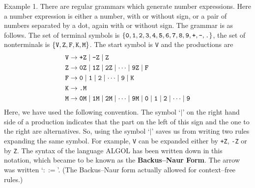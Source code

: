 {\sc Example 1.}
There are regular grammars which generate number expressions.
Here a number expression is either a number, with or without
sign, or a pair of numbers separated by a dot, again
with or without sign. The grammar is as follows. The set of
terminal symbols is $\{\mbox{\tt 0}, \mbox{\tt 1}, \mbox{\tt 2},
\mbox{\tt 3}, \mbox{\tt 4}, \mbox{\tt 5}, \mbox{\tt 6}, \mbox{\tt 7},
\mbox{\tt 8}, \mbox{\tt 9}, \mbox{\tt +}, \mbox{\tt -}, \mbox{\tt .}\}$,
the set of nonterminals is $\{\mbox{\tt V},
\mbox{\tt Z}, \mbox{\tt F}, \mbox{\tt K}, \mbox{\tt M}\}$.
The start symbol is {\tt V} and the productions are
\begin{equation}
\begin{split}
\mbox{\tt V} & \rightarrow \mbox{\tt +Z} \mid \mbox{\tt -Z} \mid 
	\mbox{\tt Z} \\
\mbox{\tt Z} & \rightarrow \mbox{\tt 0Z} \mid \mbox{\tt 1Z} \mid 
	\mbox{\tt 2Z} \mid \dotsb \mid \mbox{\tt 9Z} \mid 
	\mbox{\tt F} \\
\mbox{\tt F} & \rightarrow \mbox{\tt 0} \mid \mbox{\tt 1} \mid \mbox{\tt 2}
    \mid \dotsb \mid \mbox{\tt 9} \mid \mbox{\tt K} \\
\mbox{\tt K} & \rightarrow \mbox{\tt .M} \\
\mbox{\tt M} & \rightarrow \mbox{\tt 0M} \mid \mbox{\tt 1M} \mid 
	\mbox{\tt 2M} \mid \dotsb \mid \mbox{\tt 9M}
    \mid \mbox{\tt 0} \mid \mbox{\tt 1}
    \mid \mbox{\tt 2} \mid \dotsb \mid \mbox{\tt 9}
\end{split}
\end{equation}
Here, we have used the following convention. The symbol `$\mid$' on
the right hand side of a production indicates that the part on
the left of this sign and the one to the right are alternatives.
So, using the symbol `$\mid$' saves us from writing two rules
expanding the same symbol. For example, {\tt V} can be expanded
either by {\tt +Z}, {\tt -Z} or by {\tt Z}. The syntax of the
language {\rm ALGOL} 
has been written down in this notation,
which became to be known as the \textbf{Backus--Naur Form}. The
arrow was written `$::=$'. (The Backus--Naur form actually allowed 
for context--free rules.)

